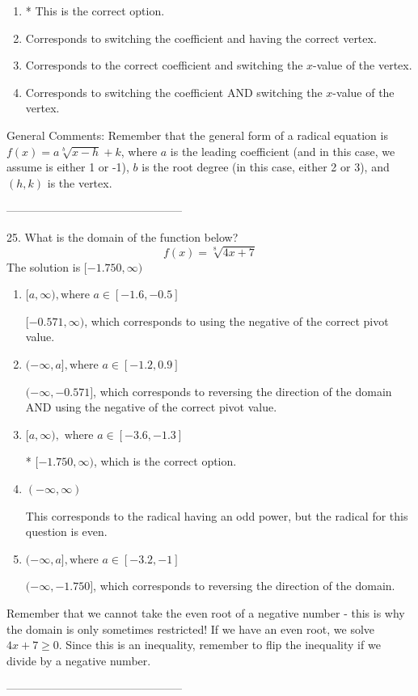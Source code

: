 \documentclass{extbook}[14pt]
\begin{document}
\begin{enumerate}[label=\Alph*.] 
\item * This is the correct option.  
\item Corresponds to switching the coefficient and having the correct vertex.  
\item Corresponds to the correct coefficient and switching the $x$-value of the vertex.  
\item Corresponds to switching the coefficient AND switching the $x$-value of the vertex.  
\end{enumerate} 
 
General Comments: Remember that the general form of a radical equation is $ f(x) = a \sqrt[b]{x - h} + k $, where $a$ is the leading coefficient (and in this case, we assume is either 1 or -1), $b$ is the root degree (in this case, either 2 or 3), and $(h, k)$ is the vertex.

-----------------------------------------------

25. What is the domain of the function below?
\[ f(x) = \sqrt[8]{4 x + 7} \] 
The solution is $ [-1.750, \infty) $ 

\begin{enumerate}[label=\Alph*.] 
\item $ [a, \infty), \text{where } a \in [-1.6, -0.5] $ 

 $[-0.571, \infty)$, which corresponds to using the negative of the correct pivot value. 
\item $ (-\infty, a], \text{where } a \in [-1.2, 0.9] $ 

 $(-\infty, -0.571]$, which corresponds to reversing the direction of the domain AND using the negative of the correct pivot value. 
\item $ [a, \infty), \text{ where } a \in [-3.6, -1.3] $ 

 * $[-1.750, \infty)$, which is the correct option. 
\item $ (-\infty, \infty) $ 

 This corresponds to the radical having an odd power, but the radical for this question is even. 
\item $ (-\infty, a], \text{where } a \in [-3.2, -1] $ 

  $(-\infty, -1.750]$, which corresponds to reversing the direction of the domain. 
\end{enumerate} 
 
Remember that we cannot take the even root of a negative number - this is why the domain is only sometimes restricted! If we have an even root, we solve $4 x + 7 \geq 0$. Since this is an inequality, remember to flip the inequality if we divide by a negative number.

-----------------------------------------------
\end{document}

